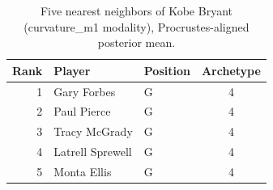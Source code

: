 \begin{table}[htbp]
  \centering\small
  \begin{tabular}{rllc}
    \toprule
    Rank & Player & Position & Archetype \\
    \midrule
    1 & Gary Forbes & G & 4 \\
    2 & Paul Pierce & G & 4 \\
    3 & Tracy McGrady & G & 4 \\
    4 & Latrell Sprewell & G & 4 \\
    5 & Monta Ellis & G & 4 \\
    \bottomrule
  \end{tabular}
  \caption{Five nearest neighbors of Kobe Bryant (curvature_m1 modality), Procrustes-aligned posterior mean.}
  \label{tab:Kobe_Bryant_neighbors_curvature_m1}
\end{table}

